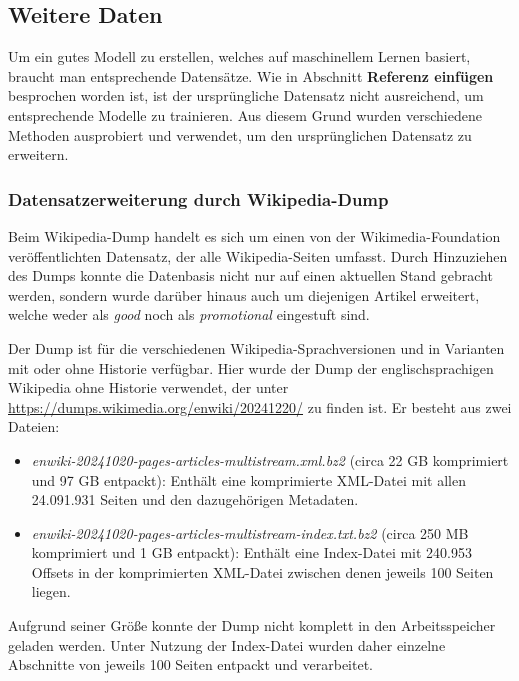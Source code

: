 \subsection{Weitere Daten}
Um ein gutes Modell zu erstellen, welches auf maschinellem Lernen basiert, braucht man entsprechende Datensätze. Wie in Abschnitt \textbf{Referenz einfügen} besprochen worden ist, ist der ursprüngliche Datensatz nicht ausreichend, um entsprechende Modelle zu trainieren. Aus diesem Grund wurden verschiedene Methoden ausprobiert und verwendet, um den ursprünglichen Datensatz zu erweitern.

\subsubsection{Datensatzerweiterung durch Wikipedia-Dump}
\label{WPDump}
Beim Wikipedia-Dump handelt es sich um einen von der Wikimedia-Foundation veröffentlichten Datensatz, der alle Wikipedia-Seiten umfasst. Durch Hinzuziehen des Dumps konnte die Datenbasis nicht nur auf einen aktuellen Stand gebracht werden, sondern wurde darüber hinaus auch um diejenigen Artikel erweitert, welche weder als \emph{good} noch als \emph{promotional} eingestuft sind.

Der Dump ist für die verschiedenen Wikipedia-Sprachversionen und in Varianten mit oder ohne Historie verfügbar. Hier wurde der Dump der englischsprachigen Wikipedia ohne Historie verwendet, der unter \url{https://dumps.wikimedia.org/enwiki/20241220/} zu finden ist. Er besteht aus zwei Dateien:

\begin{itemize}
    \item \emph{enwiki-20241020-pages-articles-multistream.xml.bz2} (circa 22 GB komprimiert und 97 GB entpackt): Enthält eine komprimierte XML-Datei mit allen 24.091.931 Seiten und den dazugehörigen Metadaten.
    \item \emph{enwiki-20241020-pages-articles-multistream-index.txt.bz2} (circa 250 MB komprimiert und 1 GB entpackt): Enthält eine Index-Datei mit 240.953 Offsets in der komprimierten XML-Datei zwischen denen jeweils 100 Seiten liegen.
\end{itemize}

Aufgrund seiner Größe konnte der Dump nicht komplett in den Arbeitsspeicher geladen werden. Unter Nutzung der Index-Datei wurden daher einzelne Abschnitte von jeweils 100 Seiten entpackt und verarbeitet.

